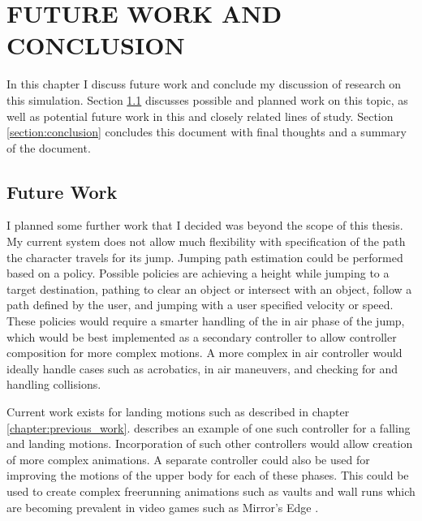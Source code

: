 
 
\chapter{FUTURE WORK AND CONCLUSION}
\label{chapter:future_work}
In this chapter I discuss future work and conclude my discussion of research on this simulation.  Section \ref{section:future_work} discusses possible and planned work on this topic, as well as potential future work in this and closely related lines of study.  Section \ref{section:conclusion} concludes this document with final thoughts and a summary of the document.

\section{Future Work}
\label{section:future_work}

I planned some further work that I decided was beyond the scope of this thesis.  My current system does not allow much flexibility with specification of the path the character travels for its jump.  Jumping path estimation could be performed based on a policy.  Possible policies are achieving a height while jumping to a target destination, pathing to clear an object or intersect with an object, follow a path defined by the user, and jumping with a user specified velocity or speed.  These policies would require a smarter handling of the in air phase of the jump, which would be best implemented as a secondary controller to allow controller composition for more complex motions.  A more complex in air controller would ideally handle cases such as acrobatics, in air maneuvers, and checking for and handling collisions.

Current work exists for landing motions such as described in chapter \ref{chapter:previous_work}.   \liufall{} \cite{falling_landing} describes an example of one such controller for a falling and landing motions.  Incorporation of such other controllers would allow creation of more complex animations.  A separate controller could also be used for improving the motions of the upper body for each of these phases.  This could be used to create complex freerunning animations such as vaults and wall runs which are becoming prevalent in video games such as Mirror's Edge \cite{mirrors_edge}.

